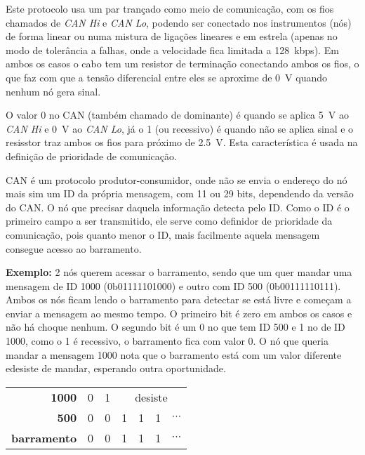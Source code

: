 Este protocolo usa um par trançado como meio de comunicação, com os fios chamados de \emph{CAN Hi} e \emph{CAN Lo}, podendo ser conectado nos instrumentos (nós) de forma linear ou numa mistura de ligações lineares e em estrela (apenas no modo de tolerância a falhas, onde a velocidade fica limitada a \SI{128}{kbps}). Em ambos os casos o cabo tem um resistor de terminação conectando ambos os fios, o que faz com que a tensão diferencial entre eles se aproxime de \SI{0}{V} quando nenhum nó gera sinal.

O valor 0 no CAN (também chamado de dominante) é quando se aplica \SI{5}{V} ao \emph{CAN Hi} e \SI{0}{V} ao \emph{CAN Lo}, já o 1 (ou recessivo) é quando não se aplica sinal e o resisstor traz ambos os fios para próximo de \SI{2,5}{V}. Esta característica é usada na definição de prioridade de comunicação.

CAN é um protocolo produtor-consumidor, onde não se envia o endereço do nó mais sim um ID da própria mensagem, com 11 ou 29 bits, dependendo da versão do CAN. O nó que precisar daquela informação detecta pelo ID. Como o ID é o primeiro campo a ser transmitido, ele serve como definidor de prioridade da comunicação, pois quanto menor o ID, mais facilmente aquela mensagem consegue acesso ao barramento.

\textbf{Exemplo:} 2 nós querem acessar o barramento, sendo que um quer mandar uma mensagem de ID 1000
(0b01111101000) e outro com ID 500 (0b00111110111). Ambos os nós ficam lendo o barramento para detectar se está livre e começam a enviar a mensagem ao mesmo tempo. O primeiro bit é zero em ambos os casos e não há choque nenhum. O segundo bit é um 0 no que tem ID 500 e 1 no de ID 1000, como o 1 é recessivo, o barramento fica com valor 0. O nó que queria mandar a mensagem 1000 nota que o barramento está com um valor diferente edesiste de mandar, esperando outra oportunidade.

\begin{center}
\begin{tabular}{r|cccccc}
    \textbf{1000}       & \cellcolor{blue!25}0 & \cellcolor{red!25}1 & \multicolumn{4}{c}{\cellcolor{gray!25}desiste} \\
    \textbf{500}        & \cellcolor{blue!25}0 & \cellcolor{blue!25}0 & \cellcolor{red!25}1   & \cellcolor{red!25}1   & \cellcolor{red!25}1   & $\cdots$  \\
    \textbf{barramento} & \cellcolor{blue!25}0 & \cellcolor{blue!25}0 & \cellcolor{red!25}1   & \cellcolor{red!25}1   & \cellcolor{red!25}1   & $\cdots$ 
\end{tabular}
\end{center}

